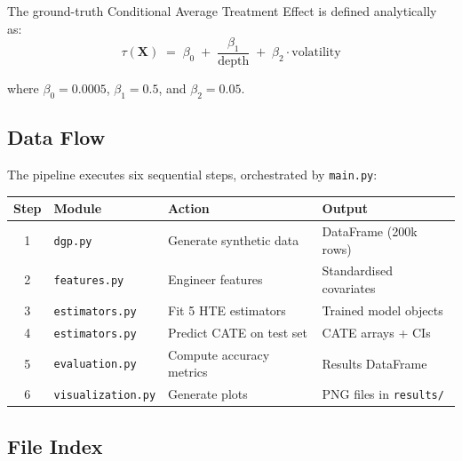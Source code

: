\documentclass[11pt, letterpaper]{article}
\begin{document}
The ground-truth Conditional Average Treatment Effect is defined analytically as:
\begin{equation}
    \tau(\mathbf{X}) \;=\; \beta_0 \;+\; \frac{\beta_1}{\text{depth}} \;+\; \beta_2 \cdot \text{volatility}
    \label{eq:cate}
\end{equation}

\noindent where $\beta_0 = 0.0005$, $\beta_1 = 0.5$, and $\beta_2 = 0.05$.

\subsection{Data Flow}

The pipeline executes six sequential steps, orchestrated by \texttt{main.py}:

\begin{center}
\begin{tabular}{clll}
    \toprule
    \textbf{Step} & \textbf{Module} & \textbf{Action} & \textbf{Output} \\
    \midrule
    1 & \texttt{dgp.py}           & Generate synthetic data      & DataFrame (200k rows) \\
    2 & \texttt{features.py}      & Engineer features             & Standardised covariates \\
    3 & \texttt{estimators.py}    & Fit 5 HTE estimators          & Trained model objects \\
    4 & \texttt{estimators.py}    & Predict CATE on test set      & CATE arrays + CIs \\
    5 & \texttt{evaluation.py}    & Compute accuracy metrics      & Results DataFrame \\
    6 & \texttt{visualization.py} & Generate plots                & PNG files in \texttt{results/} \\
    \bottomrule
\end{tabular}
\end{center}

\subsection{File Index}
\end{document}
